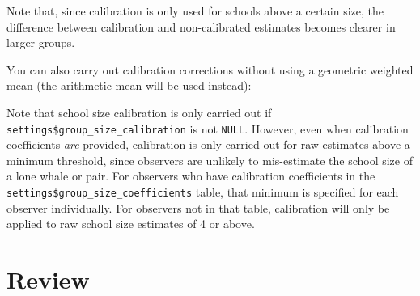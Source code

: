 \documentclass[
]{book}
\newenvironment{Shaded}{\begin{snugshade}}{\end{snugshade}}
\newcommand{\DataTypeTok}[1]{\textcolor[rgb]{0.13,0.29,0.53}{#1}}
\newcommand{\DecValTok}[1]{\textcolor[rgb]{0.00,0.00,0.81}{#1}}
\newcommand{\FloatTok}[1]{\textcolor[rgb]{0.00,0.00,0.81}{#1}}
\newcommand{\KeywordTok}[1]{\textcolor[rgb]{0.13,0.29,0.53}{\textbf{#1}}}
\newcommand{\NormalTok}[1]{#1}
\newcommand{\OperatorTok}[1]{\textcolor[rgb]{0.81,0.36,0.00}{\textbf{#1}}}
\newcommand{\OtherTok}[1]{\textcolor[rgb]{0.56,0.35,0.01}{#1}}
\newcommand{\StringTok}[1]{\textcolor[rgb]{0.31,0.60,0.02}{#1}}
\begin{document}
Note that, since calibration is only used for schools above a certain size, the difference between calibration and non-calibrated estimates becomes clearer in larger groups.

You can also carry out calibration corrections without using a geometric weighted mean (the arithmetic mean will be used instead):

\begin{Shaded}
\end{Shaded}

Note that school size calibration is only carried out if \texttt{settings\$group\_size\_calibration} is not \texttt{NULL}. However, even when calibration coefficients \emph{are} provided, calibration is only carried out for raw estimates above a minimum threshold, since observers are unlikely to mis-estimate the school size of a lone whale or pair. For observers who have calibration coefficients in the \texttt{settings\$group\_size\_coefficients} table, that minimum is specified for each observer individually. For observers not in that table, calibration will only be applied to raw school size estimates of 4 or above.

\hypertarget{review}{%
\section*{Review}\label{review}}
\end{document}

